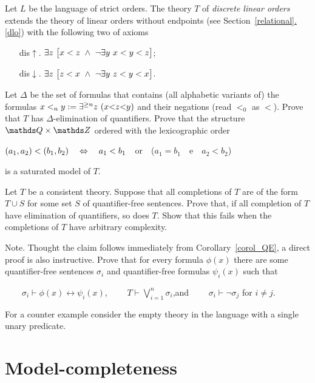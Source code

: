 \begin{exercise}\label{ex_discrete_lo}
Let $L$ be the language of strict orders. The theory $T$ of \emph{discrete linear orders\/} extends the theory of linear orders without endpoints (see Section~\hyperref[dlo]{\ref*{relational}.\ref*{dlo}}) with the following two of axioms
\begin{itemize}
\item[dis$\uparrow$.] $\E z\ \big[x<z\ \wedge\ \neg\E y\ x<y<z\big]$;
\item[dis$\downarrow$.] $\E z\ \big[ z<x\ \wedge\ \neg\E y\ z<y<x\big]$.
\end{itemize}
Let $\Delta$ be the set of formulas that contains (all alphabetic variants of) the formulas $x<_ny:=\E^{\ge n}z\ (x\mathord<z\mathord< y)$ and their negations (read $<_0$ as $<$). Prove that $T$ has $\Delta$-elimination of quantifiers. Prove that the structure $\QQ\times\ZZ$ ordered with the lexicographic order 

\hfil$(a_1,a_2)<(b_1,b_2)\quad\Leftrightarrow\quad a_1<b_1$\ \ or\ \ ($a_1=b_1$\ \ e\ \ $a_2<b_2$)

is a saturated model of $T$.\QED
\end{exercise}



\begin{exercise}
Let $T$ be a consistent theory. Suppose that all completions of $T$ are of the form 
$T\cup S$ for some set $S$ of quantifier-free sentences. Prove that, if all completion of $T$ have elimination of quantifiers, so does $T$. Show that this fails when the completions of $T$ have arbitrary complexity. 

Note. Thought the claim follows immediately from Corollary~\ref{corol_QE}, a direct proof is also instructive. Prove that for every formula $\phi(x)$ there are some quantifier-free sentences $\sigma_i$ and quantifier-free formulas $\psi_i(x)$ such that

$\displaystyle\qquad\sigma_i\vdash\phi(x)\leftrightarrow\psi_i(x)$, 
$\qquad\displaystyle T\vdash\bigvee^n_{i=1}\sigma_i$,\qquad and  $\qquad\sigma_i\vdash\neg\sigma_j$ for $i\neq j$.

For a counter example consider the empty theory in the language with a single unary predicate.\QED
\end{exercise}


\section{Model-completeness}

